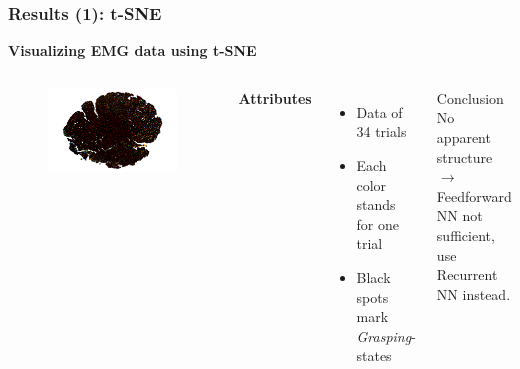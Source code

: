 \documentclass{beamer}
\begin{document}
\begin{frame}
\begin{columns}
\begin{figure}[ht]
		\end{figure}
	\end{columns}
	
\end{frame}

\begin{frame}
	\frametitle{Results (1): t-SNE}
	\textbf{Visualizing EMG data using t-SNE}
	\begin{columns}
		\begin{figure}[ht]
			\centering
			\includegraphics[width=1.0\textwidth, trim={1.5cm 0cm 1.5cm 0cm},clip]{images/emg_tsne.png}
		\end{figure}
		
		\textbf{Attributes}
		\begin{itemize}
			\item Data of 34 trials
			\item Each color stands for one trial
			\item Black spots mark \emph{Grasping}-states
		\end{itemize}
		\begin{block}{Conclusion}
			No apparent structure $\rightarrow$ Feedforward NN not sufficient, use Recurrent NN instead.
		\end{block}		
	\end{columns}	
\end{frame}
\end{document}
